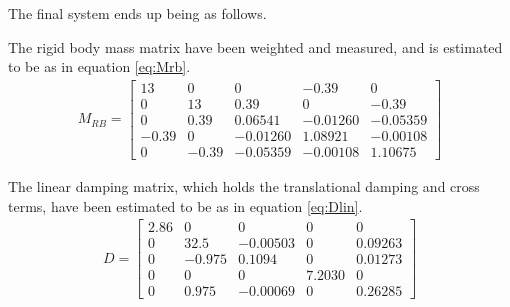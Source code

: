 
The final system ends up being as follows.

The rigid body mass matrix have been weighted and measured, and is estimated to be as in equation \ref{eq:Mrb}.
\begin{align}
M_{RB} =
\begin{bmatrix}
13 & 0 & 0 & -0.39 & 0\\
0 & 13 & 0.39 & 0 & -0.39\\
0 & 0.39 & 0.06541 & -0.01260 & -0.05359\\
-0.39 & 0 & -0.01260 & 1.08921 & -0.00108\\
0 & -0.39 & -0.05359 & -0.00108 & 1.10675
\end{bmatrix}
\label{eq:Mrb}
\end{align}

The linear damping matrix, which holds the translational damping and cross terms, have been estimated to be as in equation \ref{eq:Dlin}.
\begin{align}
D = 
\begin{bmatrix}
2.86 & 0 & 0 & 0 & 0\\
0 & 32.5 & -0.00503 & 0 & 0.09263\\
0 & -0.975 & 0.1094 & 0 & 0.01273\\
0 & 0 & 0 & 7.2030 & 0\\
0 & 0.975 & -0.00069 & 0 & 0.26285
\end{bmatrix}
\label{eq:Dlin}
\end{align}

